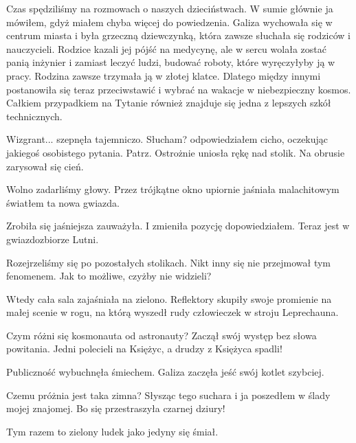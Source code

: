 Czas spędziliśmy na rozmowach o naszych dzieciństwach.
W sumie głównie ja mówiłem, gdyż miałem chyba więcej do powiedzenia.
Galiza wychowała się w centrum miasta i była grzeczną dziewczynką, która zawsze słuchała się rodziców i nauczycieli.
Rodzice kazali jej pójść na medycynę, ale w sercu wolała zostać panią inżynier i zamiast leczyć ludzi, budować roboty, które wyręczyłyby ją w pracy.
Rodzina zawsze trzymała ją w złotej klatce.
Dlatego między innymi postanowiła się teraz przeciwstawić i wybrać na wakacje w niebezpieczny kosmos.
Całkiem przypadkiem na Tytanie również znajduje się jedna z lepszych szkół technicznych.

\begin{dialogue}
	\ds{} Wizgrant... \dm{} szepnęła tajemniczo.
	\ds{} Słucham? \dm{} odpowiedziałem cicho, oczekując jakiegoś osobistego pytania.
	\ds{} Patrz. \dm{} Ostrożnie uniosła rękę nad stolik. Na obrusie zarysował się cień.
\end{dialogue}

Wolno zadarliśmy głowy. Przez trójkątne okno upiornie jaśniała malachitowym światłem ta nowa gwiazda.

\begin{dialogue}
	\ds{} Zrobiła się jaśniejsza \dm{} zauważyła.
	\ds{} I zmieniła pozycję \dm{} dopowiedziałem. \dm{} Teraz jest w gwiazdozbiorze Lutni.
\end{dialogue}

Rozejrzeliśmy się po pozostałych stolikach. Nikt inny się nie przejmował tym fenomenem.
Jak to możliwe, czyżby nie widzieli?

Wtedy cała sala zajaśniała na zielono.
Reflektory skupiły swoje promienie na małej scenie w rogu, na którą wyszedł rudy człowieczek w stroju Leprechauna.

\begin{dialogue}
	\ds{} Czym różni się kosmonauta od astronauty? \dm{} Zaczął swój występ bez słowa powitania. \dm{} Jedni polecieli na Księżyc, a drudzy z Księżyca spadli!
\end{dialogue}

Publiczność wybuchnęła śmiechem. Galiza zaczęła jeść swój kotlet szybciej.

\begin{dialogue}
	\ds{} Czemu próżnia jest taka zimna? \dm{} Słysząc tego suchara i ja poszedłem w ślady mojej znajomej. \dm{} Bo się przestraszyła czarnej dziury!
\end{dialogue}

Tym razem to zielony ludek jako jedyny się śmiał.

